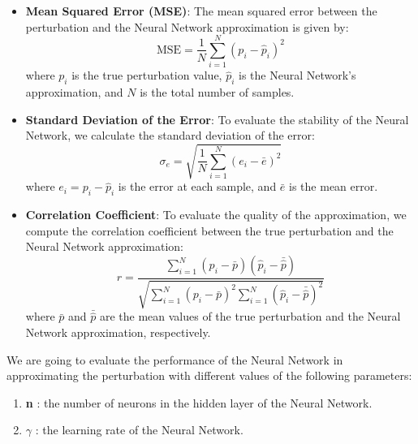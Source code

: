 \begin{itemize}
    \item \textbf{Mean Squared Error (MSE)}: The mean squared error between the perturbation and the Neural Network approximation is given by:
    \begin{equation}
        \text{MSE} = \frac{1}{N} \sum_{i=1}^{N} \left( p_i - \hat{p}_i \right)^2
    \end{equation}
    where \( p_i \) is the true perturbation value, \( \hat{p}_i \) is the Neural Network's approximation, and \( N \) is the total number of samples.

    \item \textbf{Standard Deviation of the Error}: To evaluate the stability of the Neural Network, we calculate the standard deviation of the error:
    \begin{equation}
        \sigma_e = \sqrt{\frac{1}{N} \sum_{i=1}^{N} \left( e_i - \bar{e} \right)^2}
    \end{equation}
    where \( e_i = p_i - \hat{p}_i \) is the error at each sample, and \( \bar{e} \) is the mean error.

    \item \textbf{Correlation Coefficient}: To evaluate the quality of the approximation, we compute the correlation coefficient between the true perturbation and the Neural Network approximation:
    \begin{equation}
        r = \frac{\sum_{i=1}^{N} (p_i - \bar{p})(\hat{p}_i - \bar{\hat{p}})}{\sqrt{\sum_{i=1}^{N} (p_i - \bar{p})^2 \sum_{i=1}^{N} (\hat{p}_i - \bar{\hat{p}})^2}}
    \end{equation}
    where \( \bar{p} \) and \( \bar{\hat{p}} \) are the mean values of the true perturbation and the Neural Network approximation, respectively.
\end{itemize}


We are going to evaluate the performance of the Neural Network in approximating the perturbation %
with different values of the following parameters:

\begin{enumerate}
    \item \textbf{n} : the number of neurons in the hidden layer of the Neural Network.
    \item \textbf{\(\gamma\)} : the learning rate of the Neural Network.
\end{enumerate}